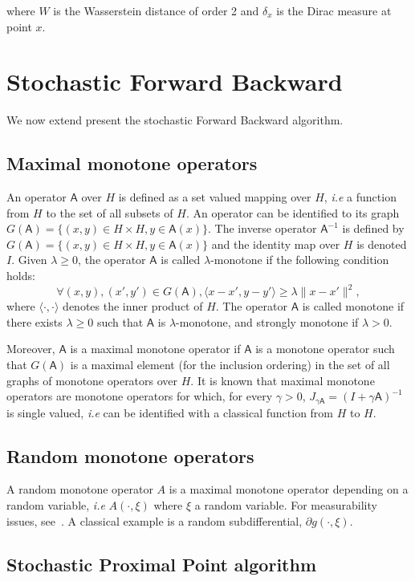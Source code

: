 \documentclass{article}
\newcommand{\1}{\mathbbm 1}
\newcommand{\sA}{{\mathsf A}}
\newcommand{\ps}[1]{\langle #1 \rangle}
\theoremstyle{definition}
\begin{document}
where $W$ is the Wasserstein distance of order 2 and $\delta_x$ is the Dirac measure at point $x$.

\section{Stochastic Forward Backward}

We now extend present the stochastic Forward Backward algorithm. 

\subsection{Maximal monotone operators}
An operator $\sA$ over $H$ is defined as a set valued mapping over $H$, \textit{i.e} a function from $H$ to the set of all subsets of $H$. An operator can be identified to its graph $G(\sA) = \{(x,y) \in H \times H, y \in \sA(x)\}$. The inverse operator $\sA^{-1}$ is defined by $G(\sA) = \{(x,y) \in H \times H, y \in \sA(x)\}$ and the identity map over $H$ is denoted $I$. Given $\lambda \geq 0$, the operator $\sA$ is called $\lambda$-monotone if the following condition holds: 
\begin{equation}
\forall (x,y),(x',y') \in G(\sA), \ps{x-x',y-y'} \geq \lambda \|x-x'\|^2,
\end{equation}
where $\ps{\cdot,\cdot}$ denotes the inner product of $H$. The operator $\sA$ is called monotone if there exists $\lambda \geq 0$ such that $\sA$ is $\lambda$-monotone, and strongly monotone if $\lambda > 0$.

Moreover, $\sA$ is a maximal monotone operator if $\sA$ is a monotone operator such that $G(\sA)$ is a maximal element (for the inclusion ordering) in the set of all graphs of monotone operators over $H$. It is known that maximal monotone operators are monotone operators for which, for every $\gamma > 0$, $J_{\gamma \sA} = (I + \gamma \sA)^{-1}$ is single valued, \textit{i.e} can be identified with a classical function from $H$ to $H$.

\subsection{Random monotone operators}
A random monotone operator $A$ is a maximal monotone operator depending on a random variable, \textit{i.e} $A(\cdot,\xi)$ where $\xi$ a random variable. For measurability issues, see~\cite{bia-hac-16}. A classical example is a random subdifferential, $\partial g(\cdot,\xi)$. 
\subsection{Stochastic Proximal Point algorithm}
\end{document}
